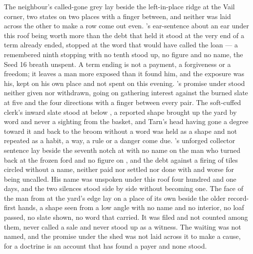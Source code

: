 The neighbour's called-gone grey lay beside the left-in-place ridge at the Vail corner, two states on two places with a finger between, and neither was laid across the other to make a row come out even. 's ear-sentence about an ear under this roof being worth more than the debt that held it stood at the very end of a term already ended, stopped at the word that would have called the loan --- a remembered ninth stopping with no tenth stood up, no figure and no name, the Seed 16 breath unspent. A term ending is not a payment, a forgiveness or a freedom; it leaves a man more exposed than it found him, and the exposure was his, kept on his own place and not spent on this evening. 's promise under  stood neither given nor withdrawn, going on gathering interest against the burned slate at five and the four directions with a finger between every pair. The soft-cuffed clerk's inward slate stood at  below , a reported shape brought up the yard by word and never a sighting from the basket, and Tarn's head having gone a degree toward it and back to the broom without a word was held as a shape and not repeated as a habit, a way, a rule or a danger come due. 's unforged collector sentence lay beside the seventh notch at  with no name on the man who turned back at the frozen ford and no figure on , and the debt against a firing of tiles circled without a name, neither paid nor settled nor done with and worse for being uncalled. His name was unspoken under this roof four hundred and one days, and the two silences stood side by side without becoming one. The face of the man from  at the yard's edge lay on a place of its own beside the older record-first hands, a shape seen from a low angle with no name and no interior, no loaf passed, no slate shown, no word that carried. It was filed and not counted among them, never called a sale and never stood up as a witness. The waiting was not named, and the promise under the shed was not laid across it to make a cause, for a doctrine is an account that has found a payer and none stood.

\scenebreak


